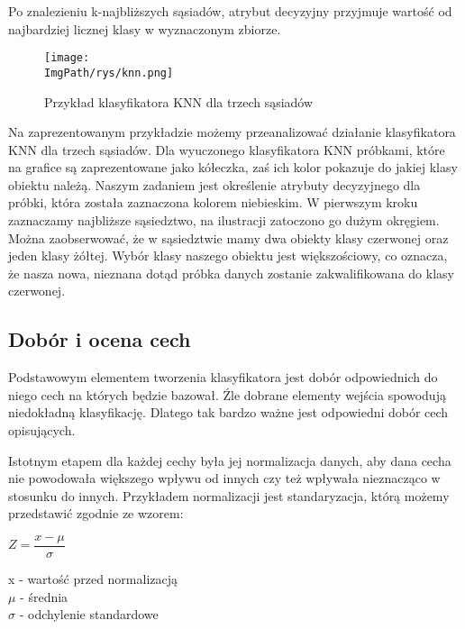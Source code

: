 \documentclass[a4paper,12pt,twoside,openany]{report}
\newcommand{\ImgPath}{.}
\begin{document}
Po znalezieniu k-najbliższych sąsiadów, atrybut decyzyjny przyjmuje wartość od najbardziej licznej klasy w wyznaczonym zbiorze.

\begin{figure}[H]	
	\centering
	\texttt{[image: \\ImgPath/rys/knn.png]}
	
	\caption{Przykład klasyfikatora KNN dla trzech sąsiadów}
\end{figure}

Na zaprezentowanym przykładzie możemy przeanalizować działanie klasyfikatora KNN dla trzech sąsiadów. Dla wyuczonego klasyfikatora KNN próbkami, które na grafice są zaprezentowane jako kółeczka, zaś ich kolor pokazuje do jakiej klasy obiektu należą. Naszym zadaniem jest określenie atrybuty decyzyjnego dla próbki, która została zaznaczona kolorem niebieskim. W pierwszym kroku zaznaczamy najbliższe sąsiedztwo, na ilustracji zatoczono go dużym okręgiem. Można zaobserwować, że w sąsiedztwie mamy dwa obiekty klasy czerwonej oraz jeden klasy żółtej. Wybór klasy naszego obiektu jest większościowy, co oznacza, że nasza nowa, nieznana dotąd próbka danych zostanie zakwalifikowana do klasy czerwonej.


\subsection{Dobór i ocena cech}
Podstawowym elementem tworzenia klasyfikatora jest dobór odpowiednich do niego cech na których będzie bazował. Źle dobrane elementy wejścia spowodują niedokładną klasyfikację. Dlatego tak bardzo ważne jest odpowiedni dobór cech opisujących.

Istotnym etapem dla każdej cechy była jej normalizacja danych, aby dana cecha nie powodowała większego wpływu od innych czy też wpływała nieznacząco w stosunku do innych. Przykładem normalizacji jest standaryzacja, którą możemy przedstawić zgodnie ze wzorem: 
\begin{center}
	{\large $ Z = \dfrac{x - \mu}{\sigma} $ \par}
\end{center}
x - wartość przed normalizacją \\ $\mu$ - średnia \\ $\sigma$ - odchylenie standardowe
\end{document}

